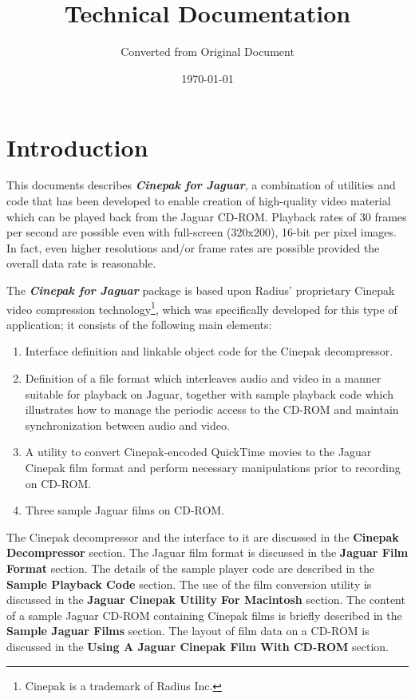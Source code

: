 \documentclass[12pt,letterpaper,twoside]{article}
\title{\Huge{\textbf{\doctitle}}\\ \vspace{0.5cm} \Large{Technical Documentation}}
\author{Converted from Original Document}
\date{\today}
\newcommand{\doctitle}{Cinepak for Jaguar}
\newcommand{\titformat}[1]{{\textbf{\textit{#1}}}}
\begin{document}
\maketitle
\thispagestyle{empty}  %

\tableofcontents
\newpage

\section{Introduction}
This documents describes \titformat{\doctitle}, a combination of utilities and code that has been developed to enable creation of high-quality video material which can be played back from the Jaguar CD-ROM. Playback rates of 30 frames per second are possible even with full-screen (320x200), 16-bit per pixel images. In fact, even higher resolutions and/or frame rates are possible provided the overall data rate is reasonable.

The \titformat{\doctitle} package is based upon Radius' proprietary Cinepak video compression technology\footnote{Cinepak is a trademark of Radius Inc.}, which was specifically developed for this type of application; it consists of the following main elements:

\begin{enumerate}[left=0pt .. 36pt]
\item Interface definition and linkable object code for the Cinepak decompressor.
\item Definition of a file format which interleaves audio and video in a manner suitable for playback on Jaguar, together with sample playback code which illustrates how to manage the periodic access to the CD-ROM and maintain synchronization between audio and video.
\item A utility to convert Cinepak-encoded QuickTime movies to the Jaguar Cinepak film format and perform necessary manipulations prior to recording on CD-ROM.
\item Three sample Jaguar films on CD-ROM.
\end{enumerate}

The Cinepak decompressor and the interface to it are discussed in the \textbf{Cinepak Decompressor} section. The Jaguar film format is discussed in the \textbf{Jaguar Film Format} section. The details of the sample player code are described in the \textbf{Sample Playback Code} section. The use of the film conversion utility is discussed in the \textbf{Jaguar Cinepak Utility For Macintosh} section. The content of a sample Jaguar CD-ROM containing Cinepak films is briefly described in the \textbf{Sample Jaguar Films} section. The layout of film data on a CD-ROM is discussed in the \textbf{Using A Jaguar Cinepak Film With CD-ROM} section.
\end{document}
